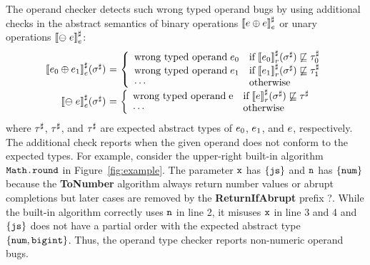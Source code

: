 The operand checker detects such wrong typed operand bugs by using additional
checks in the abstract semantics of binary operations ${\llbracket{e\oplus e}\rrbracket}^\sharp_e$
or unary operations ${\llbracket{\ominus\; e}\rrbracket}^\sharp_e$:
\[
  \begin{array}{r@{~}c@{~}l}
    \aseme{\expr_0 \bop \expr_1}(\aenv) &=& \left\{
      \begin{array}{ll}
        \text{wrong typed operand} \; \expr_0
        & \text{if} \; \asemr{\expr_0}(\aenv) \norder \aty_0\\
        \text{wrong typed operand} \; \expr_1
        & \text{if} \; \asemr{\expr_1}(\aenv) \norder \aty_1\\
        \cdots
        & \text{otherwise}\\
      \end{array}
    \right.\\

    \aseme{\uop \; \expr}(\aenv) &=& \left\{
      \begin{array}{ll}
        \text{wrong typed operand} \; $\expr$
        & \text{if} \; \asemr{\expr}(\aenv) \norder \aty\\
        \cdots
        & \text{otherwise}\\
      \end{array}
    \right.\\
  \end{array}
\]
where $\tau^\sharp$, $\tau^\sharp$, and $\tau^\sharp$ are expected abstract types of $e_0$,
$e_1$, and $e$, respectively.  The additional check reports when the
given operand does not conform to the expected types.  For example, consider the
upper-right built-in algorithm $\texttt{Math.round}$ in Figure~\ref{fig:example}.
The parameter $\texttt{x}$ has $\{ \texttt{js} \}$ and $\texttt{n}$ has $\{ \texttt{num} \}$ because the
\textbf{ToNumber} algorithm always return number values or abrupt completions
but later cases are removed by the \textbf{ReturnIfAbrupt} prefix ?.  While the
built-in algorithm correctly uses $\texttt{n}$ in line 2, it misuses $\texttt{x}$ in line 3 and
4 and $\{ \texttt{js} \}$ does not have a partial order with the expected abstract type
$\{ \texttt{num}, \texttt{bigint} \}$.  Thus, the operand type checker reports non-numeric
operand bugs.

